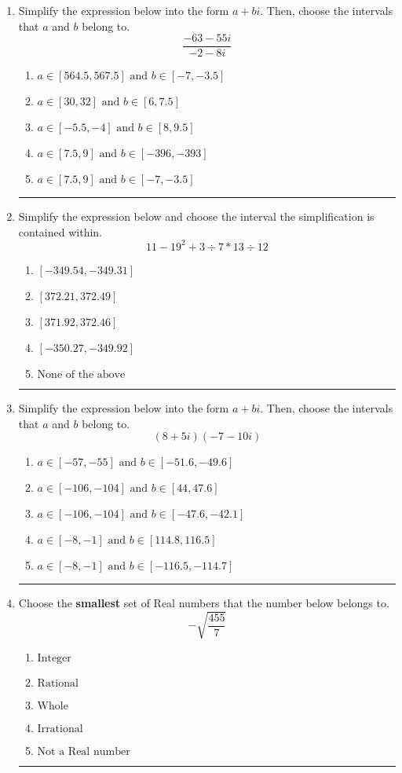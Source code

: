 \documentclass[14pt]{extbook}
\newcommand{\litem}[1]{\item#1\hspace*{-1cm}\rule{\textwidth}{0.4pt}}
\begin{document}
\begin{enumerate}
{\begin{enumerate}[label=\Alph*.]
\end{enumerate} }
\litem{
Simplify the expression below into the form $a+bi$. Then, choose the intervals that $a$ and $b$ belong to.\[ \frac{-63 - 55 i}{-2 - 8 i} \]\begin{enumerate}[label=\Alph*.]
\item \( a \in [564.5, 567.5] \text{ and } b \in [-7, -3.5] \)
\item \( a \in [30, 32] \text{ and } b \in [6, 7.5] \)
\item \( a \in [-5.5, -4] \text{ and } b \in [8, 9.5] \)
\item \( a \in [7.5, 9] \text{ and } b \in [-396, -393] \)
\item \( a \in [7.5, 9] \text{ and } b \in [-7, -3.5] \)

\end{enumerate} }
\litem{
Simplify the expression below and choose the interval the simplification is contained within.\[ 11 - 19^2 + 3 \div 7 * 13 \div 12 \]\begin{enumerate}[label=\Alph*.]
\item \( [-349.54, -349.31] \)
\item \( [372.21, 372.49] \)
\item \( [371.92, 372.46] \)
\item \( [-350.27, -349.92] \)
\item \( \text{None of the above} \)

\end{enumerate} }
\litem{
Simplify the expression below into the form $a+bi$. Then, choose the intervals that $a$ and $b$ belong to.\[ (8 + 5 i)(-7 - 10 i) \]\begin{enumerate}[label=\Alph*.]
\item \( a \in [-57, -55] \text{ and } b \in [-51.6, -49.6] \)
\item \( a \in [-106, -104] \text{ and } b \in [44, 47.6] \)
\item \( a \in [-106, -104] \text{ and } b \in [-47.6, -42.1] \)
\item \( a \in [-8, -1] \text{ and } b \in [114.8, 116.5] \)
\item \( a \in [-8, -1] \text{ and } b \in [-116.5, -114.7] \)

\end{enumerate} }
\litem{
Choose the \textbf{smallest} set of Real numbers that the number below belongs to.\[ -\sqrt{\frac{455}{7}} \]\begin{enumerate}[label=\Alph*.]
\item \( \text{Integer} \)
\item \( \text{Rational} \)
\item \( \text{Whole} \)
\item \( \text{Irrational} \)
\item \( \text{Not a Real number} \)


\end{enumerate}}
\end{enumerate}
\end{document}
